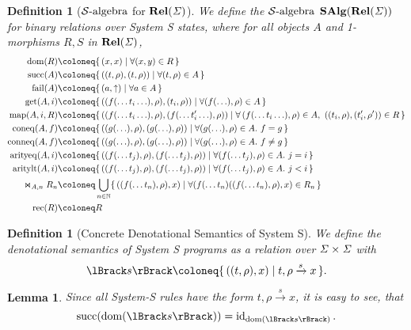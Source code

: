 \documentclass{article}
\newtheorem{definition}[theorem]{Definition}
\newtheorem{lemma}[theorem]{Lemma}
\newcommand{\fail}{\ensuremath \text{$\uparrow$}}
\newcommand{\transformx}[4]{#1, #2 \xrightarrow{#3} #4}
\newcommand{\dom}{\ensuremath \operatorname{dom}}
\newcommand{\sem}[1]{\ensuremath \lBrack #1 \rBrack}
\newcommand{\Cat}[1]{\ensuremath \mathbf{#1}}
\newcommand{\Nat}{\ensuremath \mathbb{N}}
\newcommand{\State}{\ensuremath \mathit{\Sigma} }
\newcommand{\setbuild}[2]{\ensuremath \{\, #1 \mid #2 \,\}}
\newcommand{\id}{\ensuremath \operatorname{id}}
\newcommand{\Rel}{\ensuremath \Cat{Rel}}
\newcommand{\SAlgebra}{\ensuremath \mathcal{S}\text{-algebra}}
\newcommand{\SAlg}{\ensuremath \Cat{SAlg}}
\newcommand{\lfail}{\ensuremath \operatorname{fail}}
\newcommand{\lsucc}{\ensuremath \operatorname{succ}}
\newcommand{\get}{\ensuremath \operatorname{get}}
\newcommand{\map}{\ensuremath \operatorname{map}}
\newcommand{\arityeq}{\ensuremath \operatorname{arityeq}}
\newcommand{\aritylt}{\ensuremath \operatorname{aritylt}}
\newcommand{\coneq}{\ensuremath \operatorname{coneq}}
\newcommand{\conneq}{\ensuremath \operatorname{conneq}}
\newcommand{\witharity}{\ensuremath \Join}
\newcommand{\lfix}{\ensuremath \operatorname{rec}}
\begin{document}
\begin{definition}[$\SAlgebra$ for $\Rel(\State)$] \normalfont
  We define the $\SAlgebra$ $\SAlg(\Rel(\State))$ for binary relations over System S states, where for all objects $A$ and 1-morphisms $R, S$ in $\Rel(\State)$,
  \begin{align*}
    \dom(R) &\coloneq \setbuild{(x,x)}{ \forall (x,y) \in R } \\
    \lsucc(A) &\coloneq \setbuild{((t,\rho),(t,\rho))}{ \forall (t,\rho) \in A } \\
    \lfail(A) &\coloneq \setbuild{(a,\fail)}{\forall a \in A} \\
    \get(A,i) &\coloneq \setbuild{ ((f(\ldots t_i \ldots),\rho), (t_i,\rho)) }{ \forall (f(\ldots),\rho) \in A } \\
    \map(A,i,R) &\coloneq \setbuild{ ((f(\ldots t_i \ldots),\rho),(f(\ldots t_i' \ldots),\rho)) }{ \forall\, (f(\ldots t_i \ldots),\rho) \in A,\ ((t_i,\rho),(t_i',\rho')) \in R } \\
    \coneq(A,f) &\coloneq \setbuild{ ((g(\ldots),\rho),(g(\ldots),\rho)) }{ \forall (g(\ldots),\rho) \in A.\ f = g } \\
    \conneq(A,f) &\coloneq \setbuild{ ((g(\ldots),\rho),(g(\ldots),\rho)) }{ \forall (g(\ldots),\rho) \in A.\ f \neq g } \\
    \arityeq(A,i) &\coloneq \setbuild{ ((f(\ldots t_j),\rho),(f(\ldots t_j),\rho)) }{ \forall (f(\ldots t_j),\rho) \in A.\ j = i } \\
    \aritylt(A,i) &\coloneq \setbuild{ ((f(\ldots t_j),\rho),(f(\ldots t_j),\rho)) }{ \forall (f(\ldots t_j),\rho) \in A.\ j < i } \\
    \witharity_{A,n} R_n &\coloneq \bigcup_{n \in \Nat} \setbuild{ ((f(\ldots t_n),\rho),x) }{ \forall (f(\ldots t_n) ((f(\ldots t_n),\rho),x) \in R_n } \\
    \lfix(R) &\coloneq R
  \end{align*}
\end{definition}

\begin{definition}[Concrete Denotational Semantics of System S] \normalfont
  We define the denotational semantics of System S programs as a relation over $\State \times \State$ with \[\sem{s} \coloneq \setbuild{((t,\rho),x)}{\transformx{t}{\rho}{s}{x}}.\]
\end{definition}

\begin{lemma} \normalfont
  Since all System-S rules have the form $\transformx{t}{\rho}{s}{x}$, it is easy to see, that \[ \lsucc(\dom(\sem{s})) = \id_{\dom(\sem{s})}. \]
\end{lemma}
\end{document}

